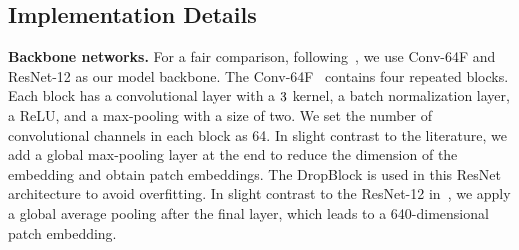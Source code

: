 \documentclass{SCIS2019}
\begin{document}
\subsection{Implementation Details}
\textbf{Backbone networks.} For a fair comparison, following~\cite{25}, we use Conv-64F and ResNet-12 as our model backbone. The Conv-64F~\cite{19,7} contains four repeated blocks. Each block has a convolutional layer with a $3\time 3$ kernel, a batch normalization layer, a ReLU, and a max-pooling with a size of two. We set the number of convolutional channels in each block as 64. In slight contrast to the literature, we add a global max-pooling layer at the end to reduce the dimension of the embedding and obtain patch embeddings. The DropBlock is used in this ResNet architecture to avoid overfitting. In slight contrast to the ResNet-12 in~\cite{29}, we apply a global average pooling after the final layer, which leads to a 640-dimensional patch embedding.
\end{document}
